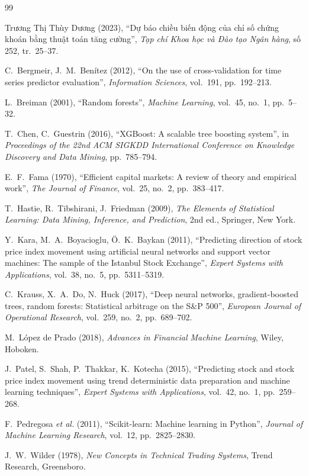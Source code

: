 \documentclass[12pt,a4paper,oneside]{report}
\begin{document}
\begin{thebibliography}{99}
\setlength{\itemsep}{2pt}

Trương Thị Thùy Dương (2023), ``Dự báo chiều biến động của chỉ số chứng khoán
bằng thuật toán tăng cường'', \textit{Tạp chí Khoa học và Đào tạo Ngân hàng},
số 252, tr.~25--37.

C.~Bergmeir, J.~M.~Benítez (2012), ``On the use of cross-validation for time
series predictor evaluation'', \textit{Information Sciences}, vol.~191,
pp.~192--213.

L.~Breiman (2001), ``Random forests'', \textit{Machine Learning}, vol.~45,
no.~1, pp.~5--32.

T.~Chen, C.~Guestrin (2016), ``XGBoost: A scalable tree boosting system'',
in \textit{Proceedings of the 22nd ACM SIGKDD International Conference on
Knowledge Discovery and Data Mining}, pp.~785--794.

E.~F.~Fama (1970), ``Efficient capital markets: A review of theory and empirical
work'', \textit{The Journal of Finance}, vol.~25, no.~2, pp.~383--417.

T.~Hastie, R.~Tibshirani, J.~Friedman (2009), \textit{The Elements of Statistical
Learning: Data Mining, Inference, and Prediction}, 2nd ed., Springer, New York.

Y.~Kara, M.~A.~Boyacioglu, Ö.~K.~Baykan (2011), ``Predicting direction of stock
price index movement using artificial neural networks and support vector
machines: The sample of the Istanbul Stock Exchange'', \textit{Expert Systems
with Applications}, vol.~38, no.~5, pp.~5311--5319.

C.~Krauss, X.~A.~Do, N.~Huck (2017), ``Deep neural networks, gradient-boosted
trees, random forests: Statistical arbitrage on the S\&P 500'', \textit{European
Journal of Operational Research}, vol.~259, no.~2, pp.~689--702.

M.~López de Prado (2018), \textit{Advances in Financial Machine Learning}, Wiley,
Hoboken.

J.~Patel, S.~Shah, P.~Thakkar, K.~Kotecha (2015), ``Predicting stock and stock
price index movement using trend deterministic data preparation and machine
learning techniques'', \textit{Expert Systems with Applications}, vol.~42,
no.~1, pp.~259--268.

F.~Pedregosa \textit{et al.} (2011), ``Scikit-learn: Machine learning in
Python'', \textit{Journal of Machine Learning Research}, vol.~12,
pp.~2825--2830.

J.~W.~Wilder (1978), \textit{New Concepts in Technical Trading Systems}, Trend
Research, Greensboro.

\end{thebibliography}
\end{document}

